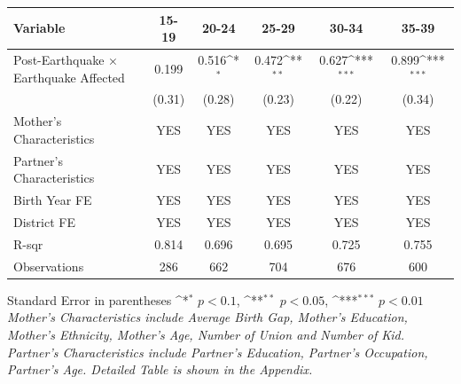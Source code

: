 \def\sym#1{\ifmmode^{#1}\else\(^{#1}\)\fi}
\renewcommand{\arraystretch}{1.4}
\small
\setlength{\tabcolsep}{10pt}
\begin{flushleft}
\begin{tabular}{@{}p{7cm}*{5}{c}@{}}
\hline\hline
Variable & 15-19 & 20-24 & 25-29 & 30-34 & 35-39 \\
\hline
Post-Earthquake × Earthquake Affected & 0.199 & 0.516\sym{*} & 0.472\sym{**} & 0.627\sym{***} & 0.899\sym{***} \\
                                      & (0.31) & (0.28) & (0.23) & (0.22) & (0.34) \\
\hline
Mother's Characteristics              & YES & YES & YES & YES & YES \\
Partner's Characteristics             & YES & YES & YES & YES & YES \\
\hline
Birth Year FE                         & YES & YES & YES & YES & YES \\
District FE                           & YES & YES & YES & YES & YES \\
R-sqr                                 & 0.814 & 0.696 & 0.695 & 0.725 & 0.755 \\
Observations                          & 286 & 662 & 704 & 676 & 600 \\
\hline\hline
\end{tabular}
\vspace{4pt}
\noindent\footnotesize
Standard Error in parentheses \sym{*} \(p<0.1\), \sym{**} \(p<0.05\), \sym{***} \(p<0.01\)\\
\textit{Mother's Characteristics include Average Birth Gap, Mother's Education, Mother's Ethnicity, Mother's Age, Number of Union and Number of Kid. Partner's Characteristics include Partner's Education, Partner's Occupation, Partner's Age. Detailed Table is shown in the Appendix.}
\end{flushleft}